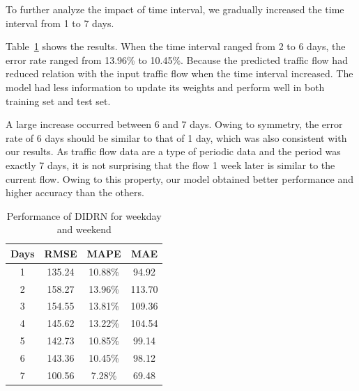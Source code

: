 \documentclass[twocolumn]{article}
\begin{document}
\par
To further analyze the impact of time interval, we gradually increased the time interval from 1 to 7 days. 
\par 
Table~\ref{tab:11} shows the results. When the time interval ranged from 2 to 6 days, the error rate ranged from 13.96\% to 10.45\%. Because the predicted traffic flow had reduced relation with the input traffic flow when the time interval increased. The model had less information to update its weights and perform well in both training set and test set.
\par
A large increase occurred between 6 and 7 days. Owing to symmetry, the error rate of 6 days should be similar to that of 1 day, which was also consistent with our results. As traffic flow data are a type of periodic data and the period was exactly 7 days, it is not surprising that the flow 1 week later is similar to the current flow. Owing to this property, our model obtained better performance and higher accuracy than the others.

\begin{table}
 \centering
    \caption{Performance of DIDRN for weekday and weekend}
    \label{tab:11}
    \begin{tabular}{cccc}
    \toprule
    Days & RMSE & MAPE & MAE\\
    \midrule
    1 &135.24 &10.88\% & 94.92 \\
    2 &158.27 &13.96\% &113.70 \\
    3 &154.55 &13.81\% &109.36 \\
    4 &145.62 &13.22\% &104.54 \\
    5 &142.73 &10.85\% &99.14 \\
    6 &143.36 &10.45\% &98.12 \\
    7 &100.56 &7.28\% &69.48 \\
    \bottomrule
    \end{tabular}
\end{table}
\end{document}
